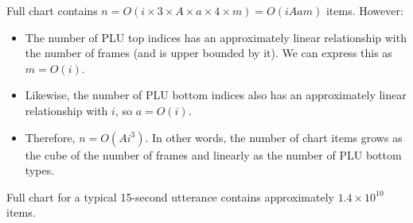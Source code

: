 \documentclass[12pt,letterpaper]{article}
\begin{document}
\noindent Full chart contains $n = O(i \times 3 \times A \times a \times 4 \times m) = O(iAam)$ items. However:
\begin{itemize}
	\item The number of PLU top indices has an approximately linear relationship with the number of frames (and is upper bounded by it). We can express this as $m=O(i)$.
	\item Likewise, the number of PLU bottom indices also has an approximately linear relationship with $i$, so $a=O(i)$. 
	\item Therefore, $n=O(Ai^3)$. In other words, the number of chart items grows as the cube of the number of frames and linearly as the number of PLU bottom types.
\end{itemize}

\noindent Full chart for a typical 15-second utterance contains approximately $1.4 \times 10^{10}$ items.
\end{document}
